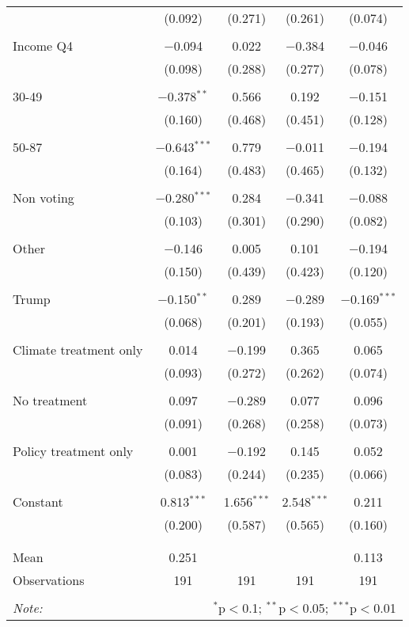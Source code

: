 \begin{tabular}{@{\extracolsep{5pt}}lcccc}
  & (0.092) & (0.271) & (0.261) & (0.074) \\ 
  & & & & \\ 
 Income Q4 & $-$0.094 & 0.022 & $-$0.384 & $-$0.046 \\ 
  & (0.098) & (0.288) & (0.277) & (0.078) \\ 
  & & & & \\ 
 30-49 & $-$0.378$^{**}$ & 0.566 & 0.192 & $-$0.151 \\ 
  & (0.160) & (0.468) & (0.451) & (0.128) \\ 
  & & & & \\ 
 50-87 & $-$0.643$^{***}$ & 0.779 & $-$0.011 & $-$0.194 \\ 
  & (0.164) & (0.483) & (0.465) & (0.132) \\ 
  & & & & \\ 
 Non voting & $-$0.280$^{***}$ & 0.284 & $-$0.341 & $-$0.088 \\ 
  & (0.103) & (0.301) & (0.290) & (0.082) \\ 
  & & & & \\ 
 Other & $-$0.146 & 0.005 & 0.101 & $-$0.194 \\ 
  & (0.150) & (0.439) & (0.423) & (0.120) \\ 
  & & & & \\ 
 Trump & $-$0.150$^{**}$ & 0.289 & $-$0.289 & $-$0.169$^{***}$ \\ 
  & (0.068) & (0.201) & (0.193) & (0.055) \\ 
  & & & & \\ 
 Climate treatment only & 0.014 & $-$0.199 & 0.365 & 0.065 \\ 
  & (0.093) & (0.272) & (0.262) & (0.074) \\ 
  & & & & \\ 
 No treatment & 0.097 & $-$0.289 & 0.077 & 0.096 \\ 
  & (0.091) & (0.268) & (0.258) & (0.073) \\ 
  & & & & \\ 
 Policy treatment only & 0.001 & $-$0.192 & 0.145 & 0.052 \\ 
  & (0.083) & (0.244) & (0.235) & (0.066) \\ 
  & & & & \\ 
 Constant & 0.813$^{***}$ & 1.656$^{***}$ & 2.548$^{***}$ & 0.211 \\ 
  & (0.200) & (0.587) & (0.565) & (0.160) \\ 
  & & & & \\ 
\hline \\[-1.8ex] 
Mean & 0.251 &  &  & 0.113 \\ 
Observations & 191 & 191 & 191 & 191 \\ 
\hline 
\hline \\[-1.8ex] 
\textit{Note:}  & \multicolumn{4}{r}{$^{*}$p$<$0.1; $^{**}$p$<$0.05; $^{***}$p$<$0.01} \\ 
\end{tabular} 
